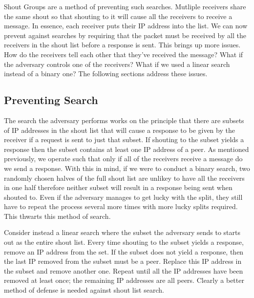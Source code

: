 \documentclass[ %
                    author={Luke Murray},
                supervisor={Dr. Simon Hollis},
                     title={Shadow Peer-to-Peer Networks},
                  subtitle={},
                    degree={MEng},
                      year={2013} ]{thesis}
\begin{document}
Shout Groups are a method of preventing such searches. Mutliple receivers share the same shout so that shouting to it will cause all the receivers to receive a message. In essence, each receiver puts their IP address into the list. We can now prevent against searches by requiring that the packet must be received by all the receivers in the shout list before a response is sent. This brings up more issues. How do the receivers tell each other that they've received the message? What if the adversary controls one of the receivers? What if we used a linear search instead of a binary one? The following sections address these issues.

\subsection{Preventing Search}

The search the adversary performs works on the principle that there are subsets of IP addresses in the shout list that will cause a response to be given by the receiver if a request is sent to just that subset. If shouting to the subset yields a response then the subset contains at least one IP address of a peer. As mentioned previously, we operate such that only if all of the receivers receive a message do we send a response. With this in mind, if we were to conduct a binary search, two randomly chosen halves of the full shout list are unlikey to have all the receivers in one half therefore neither subset will result in a response being sent when shouted to. Even if the adversary manages to get lucky with the split, they still have to repeat the process several more times with more lucky splits required. This thwarts this method of search.

Consider instead a linear search where the subset the adversary sends to starts out as the entire shout list. Every time shouting to the subset yields a response, remove an IP address from the set. If the subset does not yield a response, then the last IP removed from the subset must be a peer. Replace this IP address in the subset and remove another one. Repeat until all the IP addresses have been removed at least once; the remaining IP addresses are all peers. Clearly a better method of defense is needed against shout list search.
\end{document}
